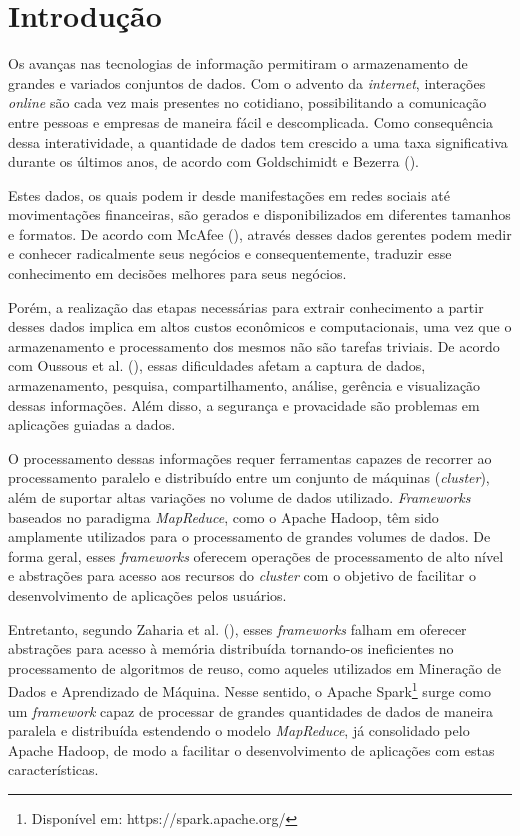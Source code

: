 \chapter{Introdução}
Os avanças nas tecnologias de informação permitiram o armazenamento de grandes e
variados conjuntos de dados. Com o advento da \textit{internet}, interações
\textit{online} são cada vez mais presentes no cotidiano, possibilitando a
comunicação entre pessoas e empresas de maneira fácil e descomplicada. Como
consequência dessa interatividade, a quantidade de dados tem crescido a uma taxa
significativa durante os últimos anos, de acordo com Goldschimidt e Bezerra
(\citeyear{goldschmidt2015data}).

Estes dados, os quais podem ir desde manifestações em redes sociais até
movimentações financeiras, são gerados e disponibilizados em diferentes tamanhos
e formatos. De acordo com McAfee (\citeyear{mcafee2012big}), através desses
dados gerentes podem medir e conhecer radicalmente seus negócios e 
consequentemente, traduzir esse conhecimento em decisões melhores para seus 
negócios.

Porém, a realização das etapas necessárias para extrair conhecimento a
partir desses dados implica em altos custos econômicos e computacionais, uma vez
que o armazenamento e processamento dos mesmos não são tarefas triviais. De
acordo com Oussous et al. (\citeyear{oussous2018big}), essas dificuldades afetam
a captura de dados, armazenamento, pesquisa, compartilhamento, análise, gerência
e visualização dessas informações. Além disso, a segurança e provacidade são
problemas em aplicações guiadas a dados.

O processamento dessas informações requer ferramentas capazes de recorrer ao
processamento paralelo e distribuído entre um conjunto de máquinas
(\textit{cluster}), além de suportar altas variações no volume de dados
utilizado. \textit{Frameworks} baseados no paradigma \textit{MapReduce}, como o
Apache Hadoop, têm sido amplamente utilizados para o processamento de grandes
volumes de dados. De forma geral, esses \textit{frameworks} oferecem operações
de processamento de alto nível e abstrações para acesso aos recursos do
\textit{cluster} com o objetivo de facilitar o desenvolvimento de aplicações
pelos usuários.

Entretanto, segundo Zaharia et al. (\citeyear{zaharia2012rdd}), esses 
\textit{frameworks} falham em oferecer abstrações para acesso à memória 
distribuída tornando-os ineficientes no processamento de algoritmos de reuso, 
como aqueles utilizados em Mineração de Dados e Aprendizado de Máquina. 
Nesse sentido, o Apache Spark\footnote{Disponível em: https://spark.apache.org/}
surge como um \textit{framework} capaz de processar de grandes quantidades de 
dados de maneira paralela e distribuída estendendo o modelo \textit{MapReduce}, 
já consolidado pelo Apache Hadoop, de modo a facilitar o desenvolvimento de 
aplicações com estas características.

